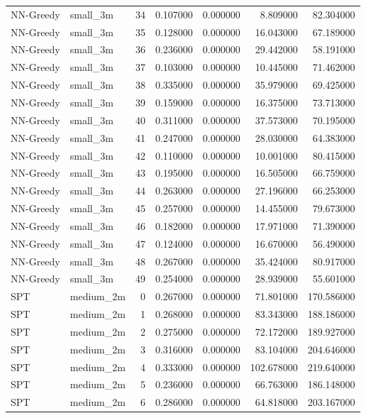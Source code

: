 \begin{tabular}{llrrrrr}
NN-Greedy & small_3m & 34 & 0.107000 & 0.000000 & 8.809000 & 82.304000 \\
NN-Greedy & small_3m & 35 & 0.128000 & 0.000000 & 16.043000 & 67.189000 \\
NN-Greedy & small_3m & 36 & 0.236000 & 0.000000 & 29.442000 & 58.191000 \\
NN-Greedy & small_3m & 37 & 0.103000 & 0.000000 & 10.445000 & 71.462000 \\
NN-Greedy & small_3m & 38 & 0.335000 & 0.000000 & 35.979000 & 69.425000 \\
NN-Greedy & small_3m & 39 & 0.159000 & 0.000000 & 16.375000 & 73.713000 \\
NN-Greedy & small_3m & 40 & 0.311000 & 0.000000 & 37.573000 & 70.195000 \\
NN-Greedy & small_3m & 41 & 0.247000 & 0.000000 & 28.030000 & 64.383000 \\
NN-Greedy & small_3m & 42 & 0.110000 & 0.000000 & 10.001000 & 80.415000 \\
NN-Greedy & small_3m & 43 & 0.195000 & 0.000000 & 16.505000 & 66.759000 \\
NN-Greedy & small_3m & 44 & 0.263000 & 0.000000 & 27.196000 & 66.253000 \\
NN-Greedy & small_3m & 45 & 0.257000 & 0.000000 & 14.455000 & 79.673000 \\
NN-Greedy & small_3m & 46 & 0.182000 & 0.000000 & 17.971000 & 71.390000 \\
NN-Greedy & small_3m & 47 & 0.124000 & 0.000000 & 16.670000 & 56.490000 \\
NN-Greedy & small_3m & 48 & 0.267000 & 0.000000 & 35.424000 & 80.917000 \\
NN-Greedy & small_3m & 49 & 0.254000 & 0.000000 & 28.939000 & 55.601000 \\
SPT & medium_2m & 0 & 0.267000 & 0.000000 & 71.801000 & 170.586000 \\
SPT & medium_2m & 1 & 0.268000 & 0.000000 & 83.343000 & 188.186000 \\
SPT & medium_2m & 2 & 0.275000 & 0.000000 & 72.172000 & 189.927000 \\
SPT & medium_2m & 3 & 0.316000 & 0.000000 & 83.104000 & 204.646000 \\
SPT & medium_2m & 4 & 0.333000 & 0.000000 & 102.678000 & 219.640000 \\
SPT & medium_2m & 5 & 0.236000 & 0.000000 & 66.763000 & 186.148000 \\
SPT & medium_2m & 6 & 0.286000 & 0.000000 & 64.818000 & 203.167000 \\

\end{tabular}
